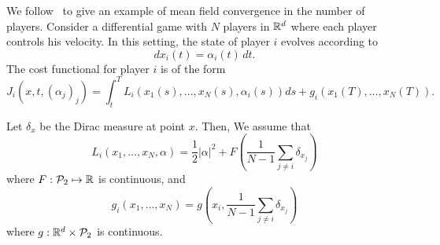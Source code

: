 We follow~\cite{cardaliaguet2010notes} to give an example of mean field convergence in the number of players.
Consider a differential game with $N$ players in $\mathbb{R}^d$ where each player
controls his velocity. In this setting, the state of player $i$
 evolves according to
\begin{equation}
    dx_i(t) = \alpha_i(t)\, dt.
\end{equation}
The cost functional for player $i$ is of the form
\begin{equation}
    J_i(x, t, {(\alpha_j)}_j) = \int_t^T L_i (x_1(s), \dots, x_N(s), \alpha_i(s)) ds + g_i(x_1(T), \dots, x_N(T)).
\end{equation}

Let $\delta_x$ be the Dirac measure at point $x$. Then, We assume that
\begin{equation}
    L_i(x_1, \dots, x_N, \alpha) = \frac{1}{2}|\alpha|^2 + F\left( \frac{1}{N-1} \sum_{j \neq i} \delta_{x_j}  \right)
\end{equation}
where $F : \mathcal{P}_2 \mapsto \mathbb{R}$ is continuous, and
\begin{equation}
    g_i(x_1, \dots, x_N) = g(x_i, \frac{1}{N-1} \sum_{j\neq i} \delta_{x_j})
\end{equation}
where $g: \mathbb{R}^d \times \mathcal{P}_2$ is continuous.

